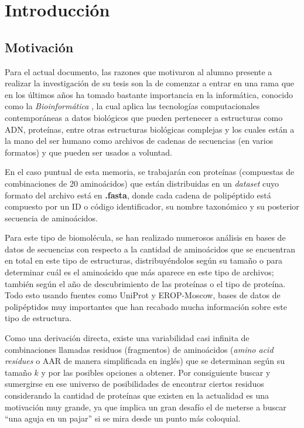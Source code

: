 \chapter*{Introducci\'on}

\section*{Motivación}

Para el actual documento, las razones que motivaron al alumno presente a realizar la investigación de su tesis son la de comenzar a 
entrar en una rama que en los últimos años ha tomado bastante importancia en la informática, conocido como la {\textit{Bioinformática}} \cite{bioinformatica}, la cual aplica las tecnologías computacionales contemporáneas a datos biológicos que pueden pertenecer a estructuras como ADN, proteínas, entre otras estructuras biológicas complejas y los cuales están a la mano del ser humano como archivos de cadenas de secuencias (en varios formatos) y que pueden ser usados a voluntad.

En el caso puntual de esta memoria, se trabajarán con proteínas (compuestas de combinaciones de 20 aminoácidos) que están distribuidas en un {\textit{dataset}} cuyo formato del archivo está en \textbf{.fasta}, donde cada cadena de polipéptido está compuesto por un ID o código identificador, su nombre taxonómico y su posterior secuencia de aminoácidos. 

Para este tipo de biomolécula, se han realizado numerosos análisis \cite{searching, array} en bases de datos de secuencias con respecto a la cantidad de aminoácidos que se encuentran en total en este tipo de estructuras, distribuyéndolos según su tamaño o para determinar cuál es el aminoácido que más aparece en este tipo de archivos; también según el año de descubrimiento de las proteínas o el tipo de proteína. Todo esto usando fuentes como UniProt y EROP-Moscow, bases de datos de polipéptidos muy importantes que han recabado mucha información sobre este tipo de estructura. 

Como una derivación directa, existe una variabilidad casi infinita de combinaciones llamadas residuos (fragmentos) de aminoácidos ({\textit{amino acid residues}} o AAR de manera simplificada en inglés) que se determinan según su tamaño $k$ y por las posibles opciones a obtener. Por consiguiente buscar y sumergirse en ese universo de posibilidades de encontrar ciertos residuos considerando la cantidad de proteínas que existen en la actualidad es una motivación muy grande, ya que implica un gran desafío el de meterse a buscar ``una aguja en un pajar'' si se mira desde un punto más coloquial.